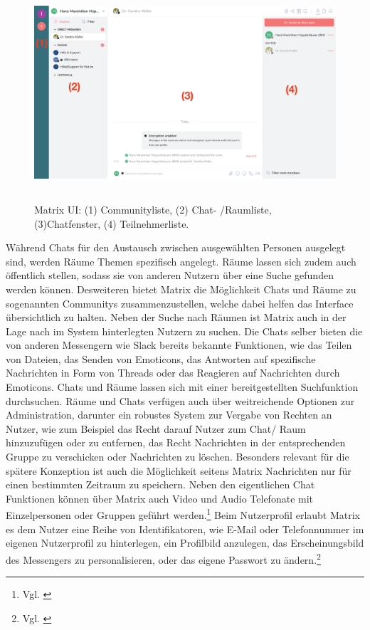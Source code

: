 \begin{figure}[htb]
    \centering
    \includegraphics[height=8cm]{graphics/unknown-3.png}
    \caption[Matrix UI]{Matrix UI: (1) Communityliste, (2) Chat- /Raumliste, (3)Chatfenster, (4) Teilnehmerliste.\footnotemark }
    \label{abb:UI}
\end{figure}

Während Chats für den Austausch zwischen ausgewählten Personen ausgelegt sind, werden Räume Themen spezifisch angelegt. Räume lassen sich zudem auch öffentlich stellen, sodass sie von anderen Nutzern über eine Suche gefunden werden können. Desweiteren bietet Matrix die Möglichkeit Chats und Räume zu sogenannten Communitys zusammenzustellen, welche dabei helfen das Interface übersichtlich zu halten.
Neben der Suche nach Räumen ist Matrix auch in der Lage nach im System hinterlegten Nutzern zu suchen. Die Chats selber bieten die von anderen Messengern wie Slack bereits bekannte Funktionen, wie das Teilen von Dateien, das Senden von Emoticons, das Antworten auf spezifische Nachrichten in Form von Threads oder das Reagieren auf Nachrichten durch Emoticons. Chats und Räume lassen sich mit einer bereitgestellten Suchfunktion durchsuchen. Räume und Chats verfügen auch über weitreichende Optionen zur Administration, darunter ein robustes System zur Vergabe von Rechten an Nutzer, wie zum Beispiel das Recht darauf Nutzer zum Chat/ Raum hinzuzufügen oder zu entfernen, das Recht Nachrichten in der entsprechenden Gruppe zu verschicken oder Nachrichten zu löschen. Besonders relevant für die spätere Konzeption ist auch die Möglichkeit seitens Matrix Nachrichten nur für einen bestimmten Zeitraum zu speichern.
Neben den eigentlichen Chat Funktionen können über Matrix auch Video und Audio Telefonate mit Einzelpersonen oder Gruppen geführt werden.\footnote{Vgl. \cite{Matrix.org2020}} Beim Nutzerprofil erlaubt Matrix es dem Nutzer eine Reihe von Identifikatoren, wie E-Mail oder Telefonnummer im eigenen Nutzerprofil zu hinterlegen, ein Profilbild anzulegen, das Erscheinungsbild des Messengers zu personalisieren, oder das eigene Passwort zu ändern.\footnote{Vgl. \cite{Github2020}}

